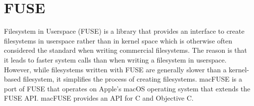 \section{FUSE}
Filesystem in Userspace (FUSE) is a library that provides an interface to create filesystems in userspace rather than in kernel space which is otherwise often considered the standard when writing commercial filesystems\cite{Libfuse2021}. The reason is that it leads to faster system calls than when writing a filesystem in userspace. However, while filesystems written with FUSE are generally slower than a kernel-based filesystem, it simplifies the process of creating filesystems. macFUSE is a port of FUSE that operates on Apple's macOS operating system that extends the FUSE API\cite{HomeMacFUSE}. macFUSE provides an API for C and Objective C.